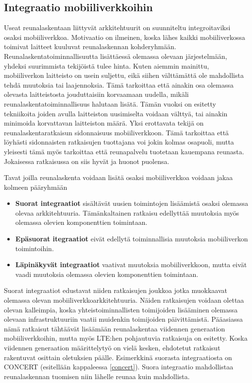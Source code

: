 \subsection{Integraatio mobiiliverkkoihin}

Useat reunalaskentaan liittyvät arkkitehtuurit on suunniteltu integroitaviksi osaksi mobiiliverkkoa.
Motivaatio on ilmeinen, koska lähes kaikki mobiiliverkossa toimivat laitteet kuuluvat reunalaskennan kohderyhmään.
Reunalaskentatoiminnallisuutta lisättäessä olemassa olevaan järjestelmään, yhdeksi suurimmista tekijöistä tulee hinta. 
Kuten aiemmin mainittu, mobiiliverkon laitteisto on usein suljettu, eikä siihen välttämättä ole mahdollista tehdä muutoksia tai laajennoksia.
Tämä tarkoittaa että ainakin osa olemassa olevasta laitteistosta jouduttaisiin korvaamaan uudella, mikäli reunalaskentatoiminnallisuus halutaan lisätä.
Tämän vuoksi on esitetty tekniikoita joiden avulla laitteiston uusimiselta voidaan välttyä, tai ainakin minimoida korvattavan laitteiston määrä.
Yksi erottavata tekijä on reunalaskentaratkaisun sidonnaisuus mobiiliverkkoon. Tämä tarkoittaa että löyhästi sidonnaisten ratkaisujen tuottajana voi jokin kolmas osapuoli, mutta yleisesti tämä myös tarkoittaa että reunapalvelu tuotetaan kauempana reunasta.
Jokaisessa ratkaisussa on siis hyvät ja huonot puolensa. 

Tavat joilla reunalaskenta voidaan lisätä osaksi mobiiliverkkoa voidaan jakaa kolmeen pääryhmään

\begin{itemize}
\item \textbf{Suorat integraatiot} sisältävät uusien toimintojen lisäämistä osaksi olemassa olevaa arkkitehtuuria. Tämänkaltainen ratkaisu edellyttää muutoksia myös olemassa olevien komponenttien toimintaan. 
\item \textbf{Epäsuorat itegraatiot} eivät edellytä toiminnallisia muutoksia mobiiliverkon toimintoihin.
\item \textbf{Läpinäkyvät integraatiot} vaativat muutoksia mobiiliverkkoon, mutta eivät vaadi muutoksia olemassa olevien komponenttien toimintaan.
\end{itemize}

Suorat integraatiot edustavat niiden ratkaisujen joukkoa jotka muokkaavat olemassa olevan mobiiliverkkoarkkitehtuuria.
Näiden ratkaisujen voidaan olettaa olevan kalleimpia, koska yhteistoiminnallisten toimijoiden lisääminen olemassa olevaan infrastruktuuriin vaatii muidenkin toimijoiden päivittämistä.
Pääasiassa nämä ratkaisut tähtäävät lisäämään reunalaskentaa viidennen generaation mobiiliverkkoihin, mutta myös LTE:hen pohjautuvia ratkaisuja on esitetty.
Koska viidennen generaation määrittelytyö on vielä kesken, ehdotetut ratkaisut rakentuvat osittain oletuksien päälle.
Esimerkkinä suorasta integraatiosta on CONCERT (esitellään kappaleessa \ref{concert}). Suora integraatio mahdollistaa reunalaskennan tuomisen niin lähelle reunaa kuin mahdollista.

